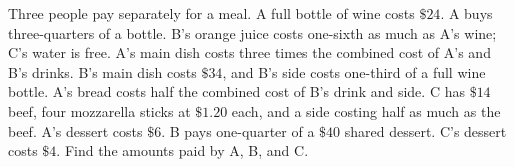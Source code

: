 Three people pay separately for a meal. A full bottle of wine costs $\$24$. A buys three-quarters of a bottle. B's orange juice costs one-sixth as much as A's wine; C's water is free. A's main dish costs three times the combined cost of A's and B's drinks. B's main dish costs $\$34$, and B's side costs one-third of a full wine bottle. A's bread costs half the combined cost of B's drink and side. C has $\$14$ beef, four mozzarella sticks at $\$1.20$ each, and a side costing half as much as the beef. A's dessert costs $\$6$. B pays one-quarter of a $\$40$ shared dessert. C's dessert costs $\$4$. Find the amounts paid by A, B, and C.
